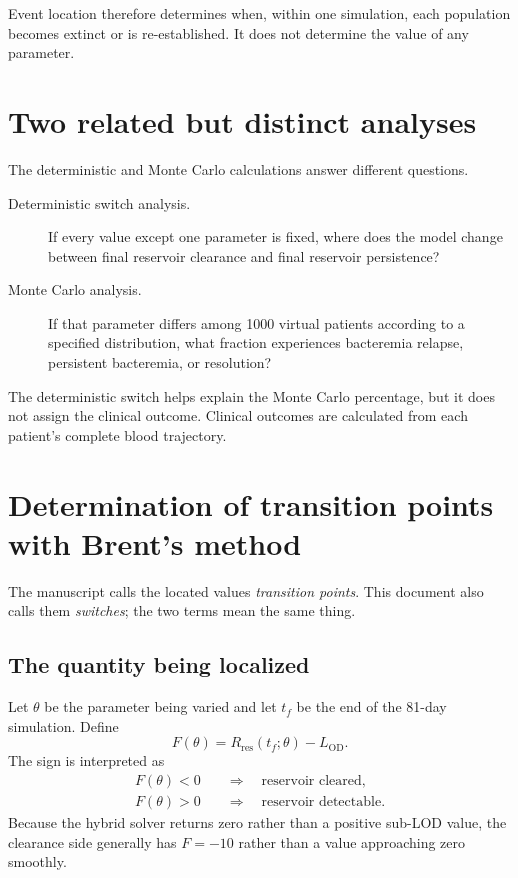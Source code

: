 \documentclass[11pt]{article}
\newcommand{\LOD}{L_{\mathrm{OD}}}
\begin{document}
Event location therefore determines when, within one simulation, each
population becomes extinct or is re-established. It does not determine the
value of any parameter.

\section{Two related but distinct analyses}

The deterministic and Monte Carlo calculations answer different questions.

\begin{description}
\item[Deterministic switch analysis.] If every value except one parameter is
fixed, where does the model change between final reservoir clearance and
final reservoir persistence?
\item[Monte Carlo analysis.] If that parameter differs among 1000 virtual
patients according to a specified distribution, what fraction experiences
bacteremia relapse, persistent bacteremia, or resolution?
\end{description}

The deterministic switch helps explain the Monte Carlo percentage, but it
does not assign the clinical outcome. Clinical outcomes are calculated from
each patient's complete blood trajectory.

\section{Determination of transition points with Brent's method}
\label{sec:transition}

The manuscript calls the located values \emph{transition points}. This
document also calls them \emph{switches}; the two terms mean the same thing.

\subsection{The quantity being localized}

Let $\theta$ be the parameter being varied and let $t_f$ be the end of the
81-day simulation. Define
\begin{equation}
F(\theta)=R_{\mathrm{res}}(t_f;\theta)-\LOD.
\label{eq:brent-objective}
\end{equation}
The sign is interpreted as
\begin{align}
F(\theta)<0 &\quad\Longrightarrow\quad \text{reservoir cleared},\\
F(\theta)>0 &\quad\Longrightarrow\quad \text{reservoir detectable}.
\end{align}
Because the hybrid solver returns zero rather than a positive sub-LOD value,
the clearance side generally has $F=-10$ rather than a value approaching
zero smoothly.
\end{document}
